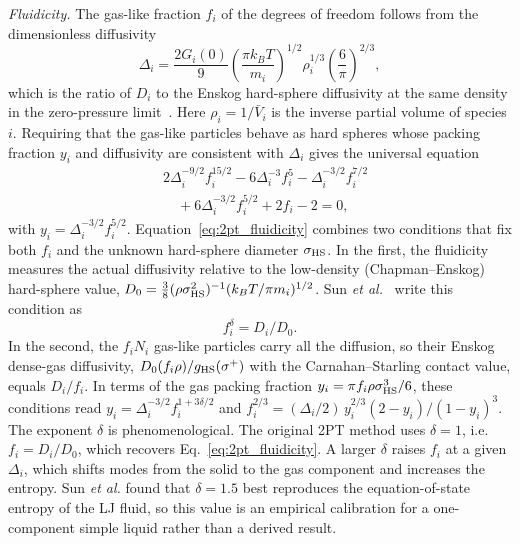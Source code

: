 \documentclass[aps,pre,twocolumn,superscriptaddress,floatfix]{revtex4-2}
\begin{document}
\emph{Fluidicity.} The gas-like fraction $f_i$ of the degrees of freedom follows from the dimensionless diffusivity
\begin{equation}
\Delta_i=\frac{2G_i(0)}{9}\left(\frac{\pi k_BT}{m_i}\right)^{1/2}\rho_{i}^{1/3}\left(\frac{6}{\pi}\right)^{2/3},
\label{eq:2pt_delta}
\end{equation}
which is the ratio of $D_i$ to the Enskog hard-sphere diffusivity at the same density in the zero-pressure limit~\cite{Lin2003}. Here $\rho_i=1/\bar V_i$ is the inverse partial volume of species $i$. Requiring that the gas-like particles behave as hard spheres whose packing fraction $y_i$ and diffusivity are consistent with $\Delta_i$ gives the universal equation
\begin{equation}
\begin{split}
&2\Delta_i^{-9/2}f_i^{15/2}-6\Delta_i^{-3}f_i^{5}-\Delta_i^{-3/2}f_i^{7/2}\\
&\quad+6\Delta_i^{-3/2}f_i^{5/2}+2f_i-2=0,
\end{split}
\label{eq:2pt_fluidicity}
\end{equation}
with $y_i=\Delta_i^{-3/2}f_i^{5/2}$. Equation~\eqref{eq:2pt_fluidicity} combines two conditions that fix both $f_i$ and the unknown hard-sphere diameter $\sigma_{\rm HS}$. In the first, the fluidicity measures the actual diffusivity relative to the low-density (Chapman--Enskog) hard-sphere value, $D_0=\frac38(\rho\sigma_{\rm HS}^2)^{-1}(k_BT/\pi m_i)^{1/2}$. Sun \emph{et al.}~\cite{Sun2017} write this condition as
\begin{equation}
f_i^{\delta}=D_i/D_0 .
\label{eq:2pt_delta_def}
\end{equation}
In the second, the $f_iN_i$ gas-like particles carry all the diffusion, so their Enskog dense-gas diffusivity, $D_0(f_i\rho)/g_{\rm HS}(\sigma^+)$ with the Carnahan--Starling contact value, equals $D_i/f_i$. In terms of the gas packing fraction $y_i=\pi f_i\rho\sigma_{\rm HS}^3/6$, these conditions read $y_i=\Delta_i^{-3/2}f_i^{1+3\delta/2}$ and $f_i^{2/3}=(\Delta_i/2)\,y_i^{2/3}(2-y_i)/(1-y_i)^3$. The exponent $\delta$ is phenomenological. The original 2PT method uses $\delta=1$, i.e.\ $f_i=D_i/D_0$, which recovers Eq.~\eqref{eq:2pt_fluidicity}. A larger $\delta$ raises $f_i$ at a given $\Delta_i$, which shifts modes from the solid to the gas component and increases the entropy. Sun \emph{et al.} found that $\delta=1.5$ best reproduces the equation-of-state entropy of the LJ fluid, so this value is an empirical calibration for a one-component simple liquid rather than a derived result.
\end{document}
